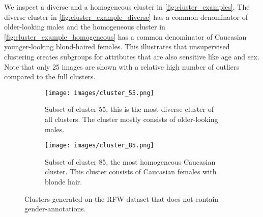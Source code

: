 We inspect a diverse and a homogeneous cluster in \autoref{fig:cluster_examples}.
The diverse cluster in \autoref{fig:cluster_example_diverse} has a common denominator of older-looking males and the homogeneous cluster in \autoref{fig:cluster_example_homogeneous} has a common denominator of Caucasian younger-looking blond-haired females.
This illustrates that unsupervised clustering creates subgroups %
for attributes that are also sensitive like age and sex.
Note that only 25 images are shown with a relative high number of outliers compared to the full clusters.

\begin{figure}[ht]
    \centering
    \begin{subfigure}{0.45\textwidth}
        \texttt{[image: images/cluster\_55.png]}
        \caption{Subset of cluster 55, this is the most diverse cluster of all clusters. The cluster mostly consists of older-looking males. }
        \label{fig:cluster_example_diverse}
    \end{subfigure}
    \hfill
    \begin{subfigure}{0.45\textwidth}
        \texttt{[image: images/cluster\_85.png]}
        \caption{Subset of cluster 85, the most homogeneous Caucasian cluster. This cluster consists of Caucasian females with blonde hair.}
        \label{fig:cluster_example_homogeneous}
    \end{subfigure}
    \caption{Clusters generated on the RFW dataset that does not contain gender-annotations. }
    \label{fig:cluster_examples}
\end{figure}
